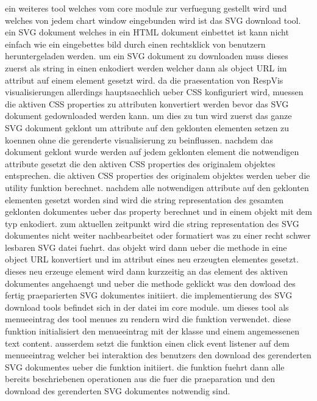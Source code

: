 ein weiteres tool welches vom core module zur verfuegung gestellt wird und welches von jedem chart window eingebunden wird ist das SVG download tool.
ein SVG dokument welches in ein HTML dokument einbettet ist kann nicht einfach wie ein eingebettes bild durch einen rechtsklick von benutzern heruntergeladen werden.
um ein SVG dokument zu downloaden muss dieses zuerst als string in einen  enkodiert werden welcher dann als object URL im  attribut auf einem  element gesetzt wird.
da die praesentation von RespVis visualisierungen allerdings hauptsaechlich ueber CSS konfiguriert wird, muessen die aktiven CSS properties zu attributen konvertiert werden bevor das SVG dokument gedownloaded werden kann.
um dies zu tun wird zuerst das ganze SVG dokument geklont um attribute auf den geklonten elementen setzen zu koennen ohne die gerenderte visualisierung zu beinflussen.
nachdem das dokument geklont wurde werden auf jedem geklonten element die notwendigen attribute gesetzt die den aktiven CSS properties des originalem objektes entsprechen.
die aktiven CSS properties des originalem objektes werden ueber die  utility funktion berechnet.
nachdem alle notwendigen attribute auf den geklonten elementen gesetzt worden sind wird die string representation des gesamten geklonten dokumentes ueber das  property berechnet und in einem  objekt mit dem typ  enkodiert.
zum aktuellen zeitpunkt wird die string representation des SVG dokumentes nicht weiter nachbearbeitet oder formatiert was zu einer recht schwer lesbaren SVG datei fuehrt.   
das  objekt wird dann ueber die  methode in eine object URL konvertiert und im  attribut eines neu erzeugten  elementes gesetzt.
dieses neu erzeuge  element wird dann kurzzeitig an das  element des aktiven dokumentes angehaengt und ueber die  methode geklickt was den dowload des fertig praeparierten SVG dokumentes initiiert.
die implementierung des SVG download tools befindet sich in der  datei im core module.
um dieses tool als menueeintrag des tool menues zu rendern wird die  funktion verwendet.
diese funktion initialisiert den menueeintrag mit der  klasse und einem angemessenen text content.
ausserdem setzt die  funktion einen click event listener auf dem menueeintrag welcher bei interaktion des benutzers den download des gerenderten SVG dokumentes ueber die  funktion initiiert.
die  funktion fuehrt dann alle bereits beschriebenen operationen aus die fuer die praeparation und den download des gerenderten SVG dokumentes notwendig sind.

